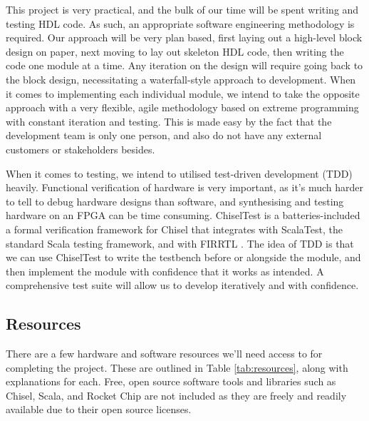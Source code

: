 \documentclass[a4paper,fleqn,12pt]{article}
\begin{document}
This project is very practical, and the bulk of our time will be spent writing and testing HDL code. As such, an appropriate software engineering methodology is required. Our approach will be very plan based, first laying out a high-level block design on paper, next moving to lay out skeleton HDL code, then writing the code one module at a time. Any iteration on the design will require going back to the block design, necessitating a waterfall-style approach to development. When it comes to implementing each individual module, we intend to take the opposite approach with a very flexible, agile methodology based on extreme programming with constant iteration and testing. This is made easy by the fact that the development team is only one person, and also do not have any external customers or stakeholders besides.

When it comes to testing, we intend to utilised test-driven development (TDD) heavily. Functional verification of hardware is very important, as it's much harder to tell to debug hardware designs than software, and synthesising and testing hardware on an FPGA can be time consuming. ChiselTest is a batteries-included a formal verification framework for Chisel that integrates with ScalaTest, the standard Scala testing framework, and with FIRRTL \citep{chiselverification}. The idea of TDD is that we can use ChiselTest to write the testbench before or alongside the module, and then implement the module with confidence that it works as intended. A comprehensive test suite will allow us to develop iteratively and with confidence.


\subsection{Resources}
There are a few hardware and software resources we'll need access to for completing the project. These are outlined in Table \ref{tab:resources}, along with explanations for each. Free, open source software tools and libraries such as Chisel, Scala, and Rocket Chip are not included as they are freely and readily available due to their open source licenses.
\end{document}
